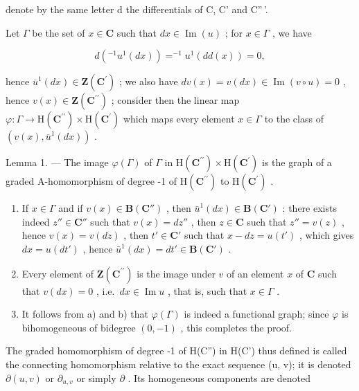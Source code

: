 denote by the same letter d the differentials of C, C' and C''\,'.

Let \(\Gamma\) be the set of \(x \in \mathbf{C}\) such that \(dx \in \operatorname{Im}(u)\) ; for \(x \in \Gamma\) , we have

\[
d \left(^ {- 1} u ^ {1} (d x)\right) = ^ {- 1} u ^ {1} (d d (x)) = 0,
\]

hence \(\overline{u}^{1}(dx)\in\mathbf{Z}(\mathbf{C}^{\prime})\) ; we also have \(dv(x)=v(dx)\in\operatorname{Im}(v\circ u)=0\) , hence \(v(x)\in\mathbf{Z}(\mathbf{C}^{\prime\prime})\) ; consider then the linear map \(\varphi:\Gamma\to\mathrm{H}(\mathbf{C}^{\prime\prime})\times\mathrm{H}(\mathbf{C}^{\prime})\) which maps every element \(x\in\Gamma\) to the class of \((v(x),\overline{u}^{1}(dx))\) .

Lemma 1. --- The image \(\varphi(\Gamma)\) of \(\Gamma\) in \(\mathrm{H}(\mathbf{C}^{\prime\prime}) \times \mathrm{H}(\mathbf{C}^{\prime})\) is the graph of a graded A-homomorphism of degree -1 of \(\mathrm{H}(\mathbf{C}^{\prime\prime})\) to \(\mathrm{H}(\mathbf{C}^{\prime})\) .

\begin{enumerate}
\def\labelenumi{\alph{enumi})}
\item
  If \(x \in \Gamma\) and if \(v(x) \in \mathbf{B}(\mathbf{C}'')\) , then \(\bar{u}^1(dx) \in \mathbf{B}(\mathbf{C}')\) : there exists indeed \(z'' \in \mathbf{C}''\) such that \(v(x) = dz''\) , then \(z \in \mathbf{C}\) such that \(z'' = v(z)\) , hence \(v(x) = v(dz)\) , then \(t' \in \mathbf{C}'\) such that \(x - dz = u(t')\) , which gives \(dx = u(dt')\) , hence \(\bar{u}^1(dx) = dt' \in \mathbf{B}(\mathbf{C}')\) .
\item
  Every element of \(\mathbf{Z}(\mathbf{C}^{\prime \prime})\) is the image under \(v\) of an element \(x\) of \(\mathbf{C}\) such that \(v(dx) = 0\) , i.e.~\(dx \in \operatorname{Im} u\) , that is, such that \(x \in \Gamma\) .
\item
  It follows from a) and b) that \(\varphi(\Gamma)\) is indeed a functional graph; since \(\varphi\) is bihomogeneous of bidegree \((0, -1)\) , this completes the proof.
\end{enumerate}

The graded homomorphism of degree -1 of H(C'') in H(C') thus defined is called the connecting homomorphism relative to the exact sequence (u, v); it is denoted \(\partial(u, v)\) or \(\partial_{u,v}\) or simply \(\partial\) . Its homogeneous components are denoted

